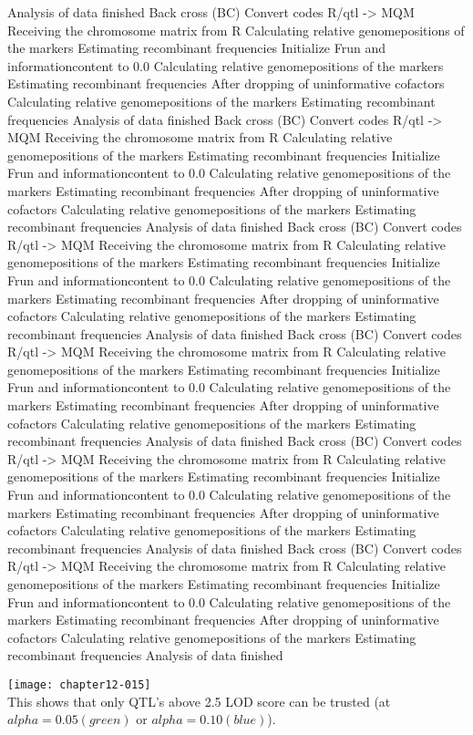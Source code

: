 \documentclass[a4paper]{article}
\begin{document}
\begin{Schunk}
\begin{Soutput}
Analysis of data finished
Back cross (BC)
Convert codes R/qtl -> MQM
Receiving the chromosome matrix from R
Calculating relative genomepositions of the markers
Estimating recombinant frequencies
Initialize Frun and informationcontent to 0.0
Calculating relative genomepositions of the markers
Estimating recombinant frequencies
After dropping of uninformative cofactors
Calculating relative genomepositions of the markers
Estimating recombinant frequencies
Analysis of data finished
Back cross (BC)
Convert codes R/qtl -> MQM
Receiving the chromosome matrix from R
Calculating relative genomepositions of the markers
Estimating recombinant frequencies
Initialize Frun and informationcontent to 0.0
Calculating relative genomepositions of the markers
Estimating recombinant frequencies
After dropping of uninformative cofactors
Calculating relative genomepositions of the markers
Estimating recombinant frequencies
Analysis of data finished
Back cross (BC)
Convert codes R/qtl -> MQM
Receiving the chromosome matrix from R
Calculating relative genomepositions of the markers
Estimating recombinant frequencies
Initialize Frun and informationcontent to 0.0
Calculating relative genomepositions of the markers
Estimating recombinant frequencies
After dropping of uninformative cofactors
Calculating relative genomepositions of the markers
Estimating recombinant frequencies
Analysis of data finished
Back cross (BC)
Convert codes R/qtl -> MQM
Receiving the chromosome matrix from R
Calculating relative genomepositions of the markers
Estimating recombinant frequencies
Initialize Frun and informationcontent to 0.0
Calculating relative genomepositions of the markers
Estimating recombinant frequencies
After dropping of uninformative cofactors
Calculating relative genomepositions of the markers
Estimating recombinant frequencies
Analysis of data finished
Back cross (BC)
Convert codes R/qtl -> MQM
Receiving the chromosome matrix from R
Calculating relative genomepositions of the markers
Estimating recombinant frequencies
Initialize Frun and informationcontent to 0.0
Calculating relative genomepositions of the markers
Estimating recombinant frequencies
After dropping of uninformative cofactors
Calculating relative genomepositions of the markers
Estimating recombinant frequencies
Analysis of data finished
Back cross (BC)
Convert codes R/qtl -> MQM
Receiving the chromosome matrix from R
Calculating relative genomepositions of the markers
Estimating recombinant frequencies
Initialize Frun and informationcontent to 0.0
Calculating relative genomepositions of the markers
Estimating recombinant frequencies
After dropping of uninformative cofactors
Calculating relative genomepositions of the markers
Estimating recombinant frequencies
Analysis of data finished
\end{Soutput}
\end{Schunk}
\texttt{[image: chapter12-015]}
\\
This shows that only QTL's above 2.5 LOD score can be trusted (at $alpha=0.05 (green)$ or $alpha=0.10 (blue)$).
\end{document}

